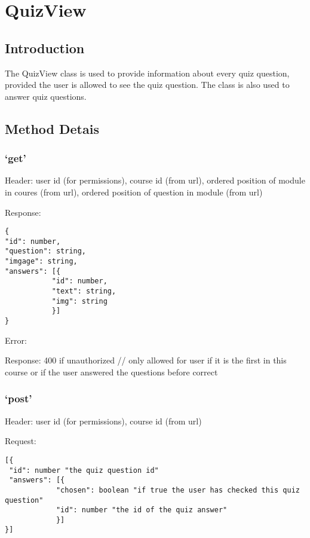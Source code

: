 \chapter*{QuizView}

\section*{Introduction}\label{introduction}

The QuizView class is used to provide information about every quiz
question, provided the user is allowed to see the quiz question. The
class is also used to answer quiz questions.

\section*{Method Detais}\label{method-detais}

\subsection*{\texorpdfstring{`get'}{get}}\label{get}

Header: user id (for permissions), course id (from url), ordered
position of module in coures (from url), ordered position of question in
module (from url)

Response:

\begin{verbatim}
{
"id": number,
"question": string,
"imgage": string,
"answers": [{
           "id": number,
           "text": string,
           "img": string
           }]
}
\end{verbatim}

Error:

Response: 400 if unauthorized // only allowed for user if it is the
first in this course or if the user answered the questions before
correct

\subsection*{\texorpdfstring{`post'}{post}}\label{post}

Header: user id (for permissions), course id (from url)

Request:

\begin{verbatim}
[{
 "id": number "the quiz question id"
 "answers": [{
            "chosen": boolean "if true the user has checked this quiz question"
            "id": number "the id of the quiz answer"
            }]
}]
\end{verbatim}

